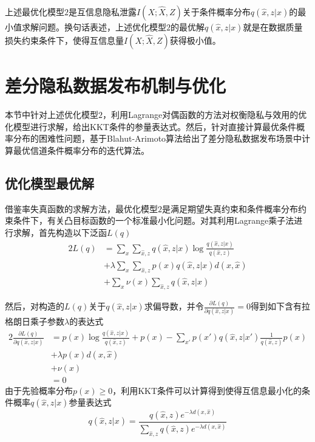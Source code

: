 上述最优化模型$2$是互信息隐私泄露$I(X;\hat{X},Z)$关于条件概率分布$q(\hat{x},z|x)$的最小值求解问题。换句话表述，上述优化模型$2$的最优解$q(\hat{x},z|x)$就是在数据质量损失约束条件下，使得互信息量$I(X;\hat{X},Z)$获得极小值。

\section{差分隐私数据发布机制与优化}\label{chapter05-optimazation-mechanism}

本节中针对上述优化模型$2$，利用Lagrange对偶函数的方法对权衡隐私与效用的优化模型进行求解，给出KKT条件的参量表达式。然后，针对直接计算最优条件概率分布的困难性问题，基于Blahut-Arimoto算法给出了差分隐私数据发布场景中计算最优信道条件概率分布的迭代算法。

\subsection{优化模型最优解}

借鉴率失真函数的求解方法，最优化模型$2$是满足期望失真约束和条件概率分布约束条件下，有关凸目标函数的一个标准最小化问题。对其利用Lagrange乘子法进行求解，首先构造以下泛函$L(q)$
\begin{alignat}{2}
	L(q) & =\sum_{x}\sum_{\hat{x},z}q(\hat{x},z|x)\log \frac{q(\hat{x},z|x)}{q(\hat{x},z)} \nonumber \\
	  & + \lambda \sum_{x}\sum_{\hat{x},z}p(x)q(\hat{x},z|x)d(x,\hat{x}) \\
	& +\sum_{x}\nu (x)\sum_{\hat{x},z}q(\hat{x},z|x) \nonumber
\end{alignat}

然后，对构造的$L(q)$关于$q(\hat{x},z|x)$求偏导数，并令$\frac{\partial L(q)}{\partial q(\hat{x},z|x)}=0$得到如下含有拉格朗日乘子参数$\lambda$的表达式
\begin{alignat}{2}
	\frac{\partial L(q)}{\partial q(\hat{x},z|x)} & =p(x)\log \frac{q(\hat{x},z|x)}{q(\hat{x},z)}+p(x)
	-\sum_{x'}p(x')q(\hat{x},z|x')\frac{1}{q(\hat{x},z)}p(x) \nonumber \\
	 & + \lambda p(x)d(x,\hat{x}) \\
	& +\nu (x) \nonumber \\
	& = 0 \nonumber
\end{alignat}
由于先验概率分布$p(x)\geq 0$，利用KKT条件可以计算得到使得互信息最小化的条件概率$q(\hat{x},z|x)$参量表达式
\begin{equation}\label{eq:chapter05-pdf}
	q(\hat{x},z|x)=\frac{q(\hat{x},z)e^{-\lambda d(x,\hat{x})}}{\sum_{\hat{x},z}q(\hat{x},z)e^{-\lambda d(x,\hat{x})}}
\end{equation}

